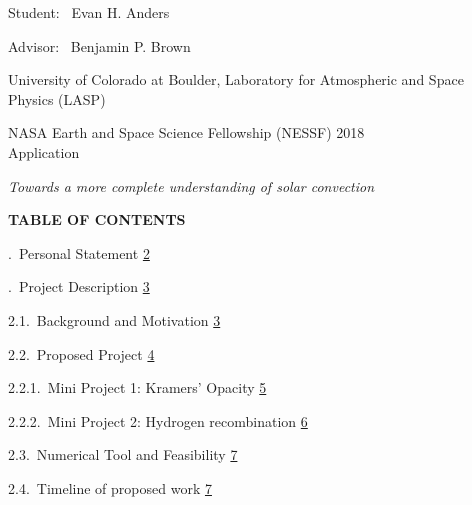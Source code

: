 \documentclass[12pt]{article}
\begin{document}
\begin{center}

\vspace*{0.07in}
Student: \, Evan H. Anders\hspace{0.6cm}

Advisor: \, Benjamin P. Brown

\vspace*{0.15in}
University of Colorado at Boulder, Laboratory for Atmospheric and Space Physics (LASP)

\vspace*{0.15in}
NASA Earth and Space Science Fellowship (NESSF) 2018 \\
Application

\vspace*{0.39in}
{\em Towards a more complete understanding of solar convection}

\vspace*{0.44in}
{\bf TABLE OF CONTENTS}
\end{center}

\vspace*{0.33in}
.$\,$ Personal Statement
\dotfill \hyperlink{page.2}{2}

\vspace*{0.06in}
.$\,$ Project Description
\dotfill \hyperlink{page.3}{3}

\vspace*{0.06in}
\noindent\hspace*{0.25in}
2.1.$\,$ Background and Motivation
\dotfill \hyperlink{page.3}{3}

\vspace*{0.06in}
\noindent\hspace*{0.25in}
2.2.$\,$ Proposed Project
\dotfill \hyperlink{page.4}{4}

\vspace*{0.06in}
\noindent\hspace*{0.50in}
2.2.1.$\,$ Mini Project 1: Kramers' Opacity
\dotfill \hyperlink{page.5}{5}

\vspace*{0.06in}
\noindent\hspace*{0.50in}
2.2.2.$\,$ Mini Project 2: Hydrogen recombination
\dotfill \hyperlink{page.6}{6}

\vspace*{0.06in}
\noindent\hspace*{0.25in}
2.3.$\,$ Numerical Tool and Feasibility
\dotfill \hyperlink{page.7}{7}

\vspace*{0.06in}
\noindent\hspace*{0.25in}
2.4.$\,$ Timeline of proposed work
\dotfill \hyperlink{page.7}{7}
\end{document}
